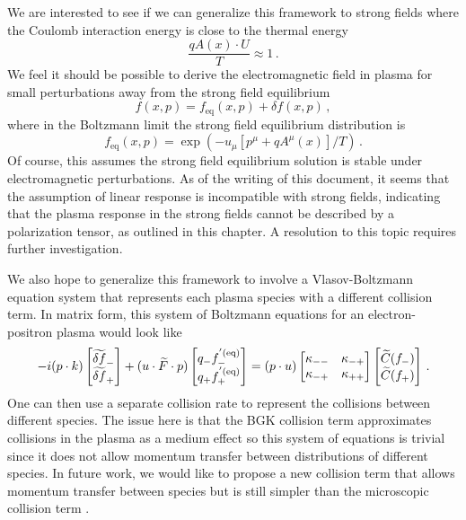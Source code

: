 We are interested to see if we can generalize this framework to strong fields where the Coulomb interaction energy is close to the thermal energy
\begin{equation}
    \frac{ qA(x)\cdot U}{T}\approx 1\,.
\end{equation}
We feel it should be possible to derive the electromagnetic field in plasma for small perturbations away from the strong field equilibrium 
\begin{equation}
    f(x,p) = f_\text{eq}(x,p) + \delta f (x,p)\,,
\end{equation}
where in the Boltzmann limit the strong field equilibrium distribution is \cite{Hakim:2011bk,Hakim:1967prd}
\begin{equation}
     f_\text{eq}(x,p) = \exp \left(-u_{\mu}[p^{\mu}+q A^{\mu}(x)]/T\right)\,.
\end{equation}
Of course, this assumes the strong field equilibrium solution is stable under electromagnetic perturbations. As of the writing of this document, it seems that the assumption of linear response is incompatible with strong fields, indicating that the plasma response in the strong fields cannot be described by a polarization tensor, as outlined in this chapter. A resolution to this topic requires further investigation.


We also hope to generalize this framework to involve a Vlasov-Boltzmann equation system that represents each plasma species with a different collision term. In matrix form, this system of Boltzmann equations for an electron-positron plasma would look like
\begin{equation}\label{eq:vectoreq}
-i (p \cdot k) \left[\begin{matrix}
\widetilde{\delta f}_- \\ \widetilde{\delta f}_+ 
\end{matrix}\right] + (u \cdot \widetilde{F} \cdot p)\left[\begin{matrix}
q_-f^{'(\mathrm{eq})}_- \\ q_+f^{'(\mathrm{eq})}_+
\end{matrix}\right] = (p \cdot u) \left[\begin{matrix}
\kappa_{--} & \kappa_{-+}\\
\kappa_{-+} & \kappa_{++}
\end{matrix}\right]\left[\begin{matrix}
\widetilde{C}(f_-) \\ \widetilde{C}(f_+)
\end{matrix} \right]\,.
\end{equation}
One can then use a separate collision rate to represent the collisions between different species. The issue here is that the BGK collision term approximates collisions in the plasma as a medium effect so this system of equations is trivial since it does not allow momentum transfer between distributions of different species. In future work, we would like to propose a new collision term that allows momentum transfer between species but is still simpler than the microscopic collision term .





